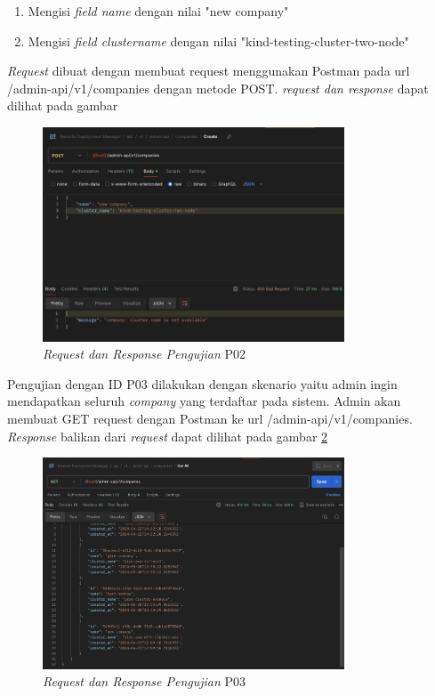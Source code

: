 \begin{enumerate}
  \item Mengisi \textit{field name} dengan nilai "new company"
  \item Mengisi \textit{field cluster\textunderscore name} dengan nilai "kind-testing-cluster-two-node"
\end{enumerate}

\textit{Request} dibuat dengan membuat request menggunakan Postman pada url /admin-api/v1/companies dengan metode POST. \textit{request dan response} dapat dilihat pada gambar

\begin{figure}[ht]
  \centering
  \includegraphics[width=0.8\textwidth]{resources/chapter-4/pengujian/p02.jpg}
  \caption{\textit{Request dan Response Pengujian} P02}
  \label{fig:pengujian-p02}
\end{figure}

Pengujian dengan ID P03 dilakukan dengan skenario yaitu admin ingin mendapatkan seluruh \textit{company} yang terdaftar pada sistem. Admin akan membuat GET request dengan Postman ke url /admin-api/v1/companies. \textit{Response} balikan dari \textit{request} dapat dilihat pada gambar \ref{fig:pengujian-p03}

\begin{figure}[ht]
  \centering
  \includegraphics[width=0.8\textwidth]{resources/chapter-4/pengujian/p03.jpg}
  \caption{\textit{Request dan Response Pengujian} P03}
  \label{fig:pengujian-p03}
\end{figure}

